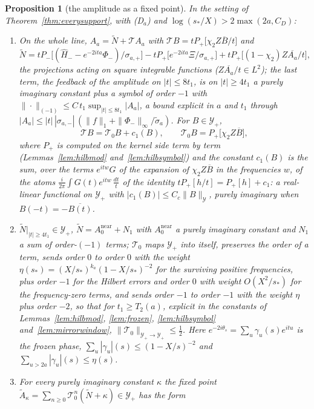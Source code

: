 \documentclass[11pt]{article}
\newtheorem{proposition}[theorem]{Proposition}
\theoremstyle{definition}
\theoremstyle{remark}
\begin{document}
\begin{proposition}[the amplitude as a fixed point]\label{prop:fixedpoint}
In the setting of Theorem~\ref{thm:everysupport}, with (D$_a$) and $\log(s_*/X)>2\max(2a,C_D)$:
\begin{enumerate}
\item[(i)] On the whole line, $A_a=\tilde N+\mathcal TA_a$ with $\mathcal TB=tP_+\big[\chi_2Z\overline B/t\big]$ and
\[
\tilde N=tP_-\big[(\hat H_--e^{-2ita}\Phi_-)/\sigma_{a,+}\big]-tP_+\big[e^{-2ita}\Xi/\sigma_{a,+}\big]+tP_+\big[(1-\chi_2)Z\overline{A_a}/t\big],
\]
the projections acting on square integrable functions ($Z\overline{A_a}/t\in L^2$); the last term, the feedback of the amplitude on $|t|\le8t_1$, is on $|t|\ge4t_1$ a purely imaginary constant plus a symbol of order $-1$ with $\|\cdot\|_{(-1)}\le C\,t_1\sup_{|t|\le8t_1}|A_a|$, a bound explicit in $a$ and $t_1$ through $|A_a|\le|t|\,|\sigma_{a,-}|\,(\|f\|_1+\|\Phi_-\|_\infty/\tilde\sigma_a)$. For $B\in\mathcal Y_+$,
\[
\mathcal TB=\mathcal T_0B+c_1(B),\qquad \mathcal T_0B=P_+\big[\chi_2Z\overline B\big],
\]
where $P_+$ is computed on the kernel side term by term (Lemmas~\ref{lem:hilbmod} and~\ref{lem:hilbsymbol}) and the constant $c_1(B)$ is the sum, over the terms $e^{itw}G$ of the expansion of $\chi_2Z\overline B$ in the frequencies $w$, of the atoms $\frac i{2\pi}\int G(t)e^{itw}\,\frac{dt}t$ of the identity $tP_+[h/t]=P_+[h]+c_1$: a real-linear functional on $\mathcal Y_+$ with $|c_1(B)|\le C_c\|B\|_{\mathcal Y}$, purely imaginary when $B(-t)=-\overline{B(t)}$.
\item[(ii)] $\tilde N|_{|t|\ge4t_1}\in\mathcal Y_+$, $\tilde N=A_0^{\mathrm{near}}+N_1$ with $A_0^{\mathrm{near}}$ a purely imaginary constant and $N_1$ a sum of order-$(-1)$ terms; $\mathcal T_0$ maps $\mathcal Y_+$ into itself, preserves the order of a term, sends order $0$ to order $0$ with the weight $\eta(s_*)=(X/s_*)^{k_a}(1-X/s_*)^{-2}$ for the surviving positive frequencies, plus order $-1$ for the Hilbert errors and order $0$ with weight $O(X^2/s_*)$ for the frequency-zero terms, and sends order $-1$ to order $-1$ with the weight $\eta$ plus order $-2$, so that for $t_1\ge T_2(a)$, explicit in the constants of Lemmas~\ref{lem:hilbmod}, \ref{lem:frozen}, \ref{lem:hilbsymbol} and~\ref{lem:mirrorwindow}, $\|\mathcal T_0\|_{\mathcal Y_+\to\mathcal Y_+}\le\tfrac12$. Here $e^{-2i\theta_s}=\sum_u\gamma_u(s)e^{itu}$ is the frozen phase, $\sum_u|\gamma_u|(s)\le(1-X/s)^{-2}$ and $\sum_{u>2a}|\gamma_u|(s)\le\eta(s)$.
\item[(iii)] For every purely imaginary constant $\kappa$ the fixed point $\tilde A_\kappa=\sum_{n\ge0}\mathcal T_0^n(\tilde N+\kappa)\in\mathcal Y_+$ has the form

\end{enumerate}
\end{proposition}
\end{document}
